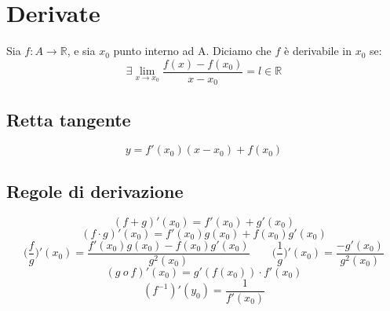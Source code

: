 \section{Derivate}
Sia $f: A\to\mathbb{R}$, e sia $x_0$ punto interno ad A. Diciamo che $f$ è derivabile in $x_0$ se:
\begin{equation}
    \exists\lim_{x\to x_0}\frac{f(x)-f(x_0)}{x-x_0} = l \in\mathbb{R}
\end{equation}


\subsection{Retta tangente}
\begin{equation}
    y = f'(x_0)(x-x_0) + f(x_0)
\end{equation}

\subsection{Regole di derivazione}
\begin{equation}
    (f+g)'(x_0) = f'(x_0) + g'(x_0)
\end{equation}
\begin{equation}
    (f\cdot g)'(x_0) = f'(x_0) g(x_0) + f(x_0)g'(x_0)
\end{equation}
\begin{equation}
    \bigg(\frac{f}{g}\bigg)'(x_0) = \frac{f'(x_0) g(x_0) - f(x_0)g'(x_0)}{g^2(x_0)} \qquad \bigg(\frac{1}{g}\bigg)'(x_0) = \frac{-g'(x_0)}{g^2(x_0)}\end{equation}
\begin{equation}
    (g\ o\ f)'(x_0) = g'(f(x_0))\cdot f'(x_0)
\end{equation}
\begin{equation}
    (f^{-1})'(y_0) = \frac{1}{f'(x_0)}
\end{equation}

